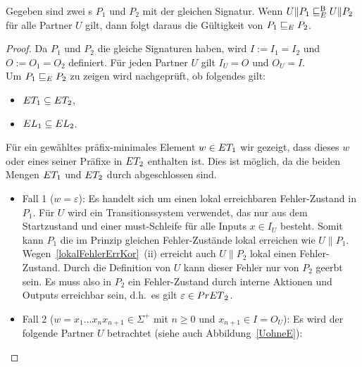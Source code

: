 \begin{Lem}
  \label{KommVerfeinLem}
  Gegeben sind zwei \MEIO{}s $P_1$ und $P_2$ mit der gleichen Signatur. Wenn
  $U\|P_1 \sqsubseteq  _E^\mathrm{B}{} U\|P_2$ für alle Partner $U$ gilt, dann folgt daraus die
  Gültigkeit von $P_1 \sqsubseteq  _E{} P_2$.
\end{Lem}
\begin{proof}
  Da $P_1$ und $P_2$ die gleiche Signaturen haben, wird $I:=I_1=I_2$ und
  $O:=O_1=O_2$ definiert. Für jeden Partner $U$ gilt $I_U=O$ und $O_U=I$.\\
  Um $P_1 \sqsubseteq  _E{}P_2$ zu zeigen wird nachgeprüft, ob folgendes gilt:
  \begin{itemize}
    \item $ET _1\subseteq ET _2$,
    \item $EL _1\subseteq EL _2$.
  \end{itemize}
  Für ein gewähltes präfix-minimales Element $w\in ET _1$ wir gezeigt, dass
  dieses $w$ oder eines seiner Präfixe in $ET _2$ enthalten ist. Dies ist
  möglich, da die beiden Mengen $ET _1$ und $ET _2$ durch \cont{}
  abgeschlossen sind.
  \begin{itemize}
    \item Fall 1 ($w=\varepsilon$): Es handelt sich um einen lokal erreichbaren
      Fehler-Zustand in $P_1$. Für $U$ wird ein Transitionssystem verwendet,
      das nur aus dem Startzustand und einer must-Schleife für alle Inputs
      $x\in I_U$ besteht. Somit kann $P_1$ die im Prinzip gleichen
      Fehler-Zustände lokal erreichen wie $U\|P_1$.
      Wegen~\ref{lokalFehlerErrKor}~(ii) erreicht auch $U\|P_2$ lokal einen
      Fehler-Zustand. Durch die Definition von $U$ kann dieser Fehler nur von
      $P_2$ geerbt sein. Es muss also in $P_2$ ein Fehler-Zustand durch interne
      Aktionen und Outputs erreichbar sein, d.h.\ es gilt $\varepsilon\in
      PrET{}_2$.
    \item Fall 2 ($w=x_1\dots x_n x_{n+1}\in\Sigma ^+$ mit $n\geq 0$ und
      $x_{n+1}\in I = O_U$): Es wird der folgende Partner $U$ betrachtet (siehe
      auch Abbildung~\ref{UohneE}):
\end{itemize}
\end{proof}
